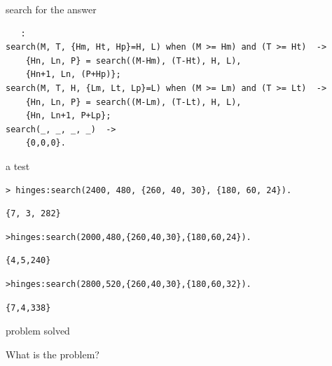 \begin{frame}[fragile]{search for the answer}

\begin{verbatim}
   :
search(M, T, {Hm, Ht, Hp}=H, L) when (M >= Hm) and (T >= Ht)  ->
    {Hn, Ln, P} = search((M-Hm), (T-Ht), H, L),
    {Hn+1, Ln, (P+Hp)};
search(M, T, H, {Lm, Lt, Lp}=L) when (M >= Lm) and (T >= Lt)  ->
    {Hn, Ln, P} = search((M-Lm), (T-Lt), H, L),
    {Hn, Ln+1, P+Lp};
search(_, _, _, _)  ->
    {0,0,0}.
\end{verbatim}
\end{frame}


\begin{frame}[fragile]{a test}

\begin{verbatim}
> hinges:search(2400, 480, {260, 40, 30}, {180, 60, 24}).
\end{verbatim}
\pause
\begin{verbatim}
{7, 3, 282}
\end{verbatim}
\pause
\begin{verbatim}
>hinges:search(2000,480,{260,40,30},{180,60,24}).
\end{verbatim}
\pause
\begin{verbatim}
{4,5,240}
\end{verbatim}
\begin{verbatim}
>hinges:search(2800,520,{260,40,30},{180,60,32}).
\end{verbatim}
\pause
\begin{verbatim}
{7,4,338}
\end{verbatim}

\end{frame}

\begin{frame}{problem solved}

\pause
\vspace{40pt}\hspace{140pt}What is the problem?

\end{frame}

